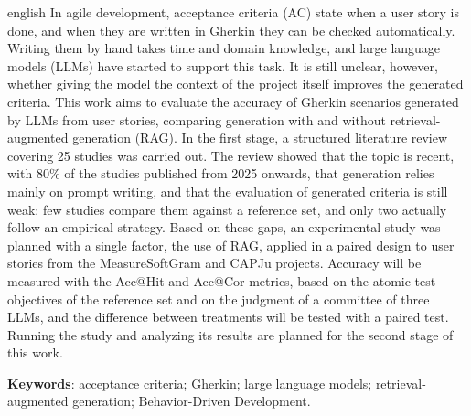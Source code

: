 \begin{resumo}[Abstract]
 \begin{otherlanguage*}{english}
  In agile development, acceptance criteria (AC) state when a user story is done, and when they are written in Gherkin they can be checked automatically. Writing them by hand takes time and domain knowledge, and large language models (LLMs) have started to support this task. It is still unclear, however, whether giving the model the context of the project itself improves the generated criteria. This work aims to evaluate the accuracy of Gherkin scenarios generated by LLMs from user stories, comparing generation with and without retrieval-augmented generation (RAG). In the first stage, a structured literature review covering 25 studies was carried out. The review showed that the topic is recent, with 80\% of the studies published from 2025 onwards, that generation relies mainly on prompt writing, and that the evaluation of generated criteria is still weak: few studies compare them against a reference set, and only two actually follow an empirical strategy. Based on these gaps, an experimental study was planned with a single factor, the use of RAG, applied in a paired design to user stories from the MeasureSoftGram and CAPJu projects. Accuracy will be measured with the Acc@Hit and Acc@Cor metrics, based on the atomic test objectives of the reference set and on the judgment of a committee of three LLMs, and the difference between treatments will be tested with a paired test. Running the study and analyzing its results are planned for the second stage of this work.

  \vspace{\onelineskip}

  \noindent
  \textbf{Keywords}: acceptance criteria; Gherkin; large language models; retrieval-augmented generation; Behavior-Driven Development.
 \end{otherlanguage*}
\end{resumo}
